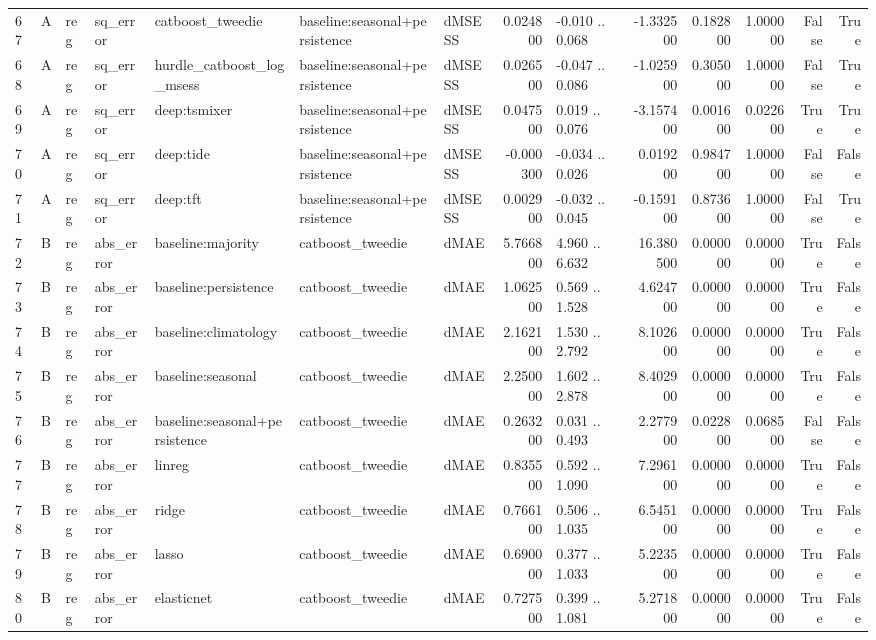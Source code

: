 \begin{table}
\begin{tabular}{lllllllrlrrrrr}
67 & A & reg & sq\_error & catboost\_tweedie & baseline:seasonal+persistence & dMSESS & 0.024800 & -0.010 .. 0.068 & -1.332500 & 0.182800 & 1.000000 & False & True \\
68 & A & reg & sq\_error & hurdle\_catboost\_log\_msess & baseline:seasonal+persistence & dMSESS & 0.026500 & -0.047 .. 0.086 & -1.025900 & 0.305000 & 1.000000 & False & True \\
69 & A & reg & sq\_error & deep:tsmixer & baseline:seasonal+persistence & dMSESS & 0.047500 & 0.019 .. 0.076 & -3.157400 & 0.001600 & 0.022600 & True & True \\
70 & A & reg & sq\_error & deep:tide & baseline:seasonal+persistence & dMSESS & -0.000300 & -0.034 .. 0.026 & 0.019200 & 0.984700 & 1.000000 & False & False \\
71 & A & reg & sq\_error & deep:tft & baseline:seasonal+persistence & dMSESS & 0.002900 & -0.032 .. 0.045 & -0.159100 & 0.873600 & 1.000000 & False & True \\
72 & B & reg & abs\_error & baseline:majority & catboost\_tweedie & dMAE & 5.766800 & 4.960 .. 6.632 & 16.380500 & 0.000000 & 0.000000 & True & False \\
73 & B & reg & abs\_error & baseline:persistence & catboost\_tweedie & dMAE & 1.062500 & 0.569 .. 1.528 & 4.624700 & 0.000000 & 0.000000 & True & False \\
74 & B & reg & abs\_error & baseline:climatology & catboost\_tweedie & dMAE & 2.162100 & 1.530 .. 2.792 & 8.102600 & 0.000000 & 0.000000 & True & False \\
75 & B & reg & abs\_error & baseline:seasonal & catboost\_tweedie & dMAE & 2.250000 & 1.602 .. 2.878 & 8.402900 & 0.000000 & 0.000000 & True & False \\
76 & B & reg & abs\_error & baseline:seasonal+persistence & catboost\_tweedie & dMAE & 0.263200 & 0.031 .. 0.493 & 2.277900 & 0.022800 & 0.068500 & False & False \\
77 & B & reg & abs\_error & linreg & catboost\_tweedie & dMAE & 0.835500 & 0.592 .. 1.090 & 7.296100 & 0.000000 & 0.000000 & True & False \\
78 & B & reg & abs\_error & ridge & catboost\_tweedie & dMAE & 0.766100 & 0.506 .. 1.035 & 6.545100 & 0.000000 & 0.000000 & True & False \\
79 & B & reg & abs\_error & lasso & catboost\_tweedie & dMAE & 0.690000 & 0.377 .. 1.033 & 5.223500 & 0.000000 & 0.000000 & True & False \\
80 & B & reg & abs\_error & elasticnet & catboost\_tweedie & dMAE & 0.727500 & 0.399 .. 1.081 & 5.271800 & 0.000000 & 0.000000 & True & False \\

\end{tabular}
\end{table}
